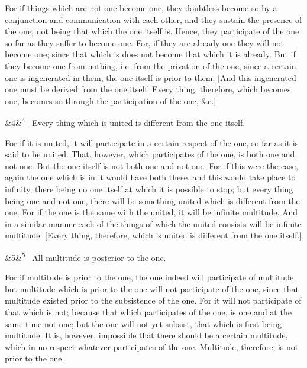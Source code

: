 \documentclass[12pt]{article}
\newcommand{\para}[1][]{\par\noindent\ifx&#1&\else\textsuperscript{\footnotesize #1}~\fi}
\begin{document}
For if things which are not one become one, they doubtless become so by a conjunction and communication with each other, and they sustain the presence of the one, not being that which the one itself is. Hence, they participate of the one so far as they suffer to become one. For, if they are already one they will not become one; since that which is does not become that which it is already. But if they become one from nothing, i.e. from the privation of the one, since a certain one is ingenerated in them, the one itself is prior to them. [And this ingenerated one must be derived from the one itself. Every thing, therefore, which becomes one, becomes so through the participation of the one, \&c.]

\para[4] Every thing which is united is different from the one itself.

For if it is united, it will participate in a certain respect of the one, so far as it is said to be united. That, however, which participates of the one, is both one and not one. But the one itself is not both one and not one. For if this were the case, again the one which is in it would have both these, and this would take place to infinity, there being no one itself at which it is possible to stop; but every thing being one and not one, there will be something united which is different from the one. For if the one is the same with the united, it will be infinite multitude. And in a similar manner each of the things of which the united consists will be infinite multitude. [Every thing, therefore, which is united is different from the one itself.]

\para[5] All multitude is posterior to the one.

For if multitude is prior to the one, the one indeed will participate of multitude, but multitude which is prior to the one will not participate of the one, since that multitude existed prior to the subsistence of the one. For it will not participate of that which is not; because that which participates of the one, is one and at the same time not one; but the one will not yet subsist, that which is first being multitude. It is, however, impossible that there should be a certain multitude, which in no respect whatever participates of the one. Multitude, therefore, is not prior to the one.
\end{document}
